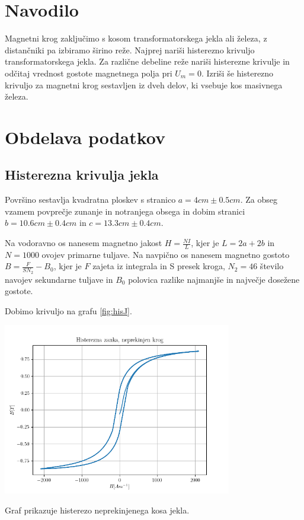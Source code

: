 \documentclass[12pt]{report}
\begin{document}
\chapter*{Navodilo}

Magnetni krog zaključimo s kosom transformatorskega jekla ali železa, z distančniki pa izbiramo širino reže. Najprej nariši histerezno krivuljo transformatorskega jekla. Za različne debeline reže nariši histerezne krivulje in odčitaj vrednost gostote magnetnega polja pri $U_m=0$. Izriši še histerezno krivuljo za magnetni krog sestavljen iz dveh delov, ki vsebuje kos masivnega železa. 
\endgroup


\chapter*{Obdelava podatkov}

\section*{Histerezna krivulja jekla}

Površino sestavlja kvadratna ploskev s stranico $a = 4cm \pm 0.5cm$. Za obseg vzamem povprečje zunanje in notranjega obsega in dobim stranici $b = 10.6cm \pm 0.4cm$ in $c = 13.3cm \pm 0.4cm$. 

Na vodoravno os nanesem magnetno jakost $H = \frac{NI}{L}$, kjer je $L = 2a + 2b$ in $N=1000$ ovojev primarne tuljave. Na navpično os nanesem magnetno gostoto $B= \frac{F}{SN_2} - B_0$, kjer je $F$ zajeta iz integrala in S presek kroga, $N_2 = 46$ število navojev sekundarne tuljave in $B_0$ polovica razlike najmanjše in največje dosežene gostote. 

Dobimo krivuljo na grafu \ref{fig:hisJ}. 

\begin{slika}[H]
  \centering
  \includegraphics[width=0.75\textwidth]{jeklo}
  \caption{\small Graf prikazuje histerezo neprekinjenega kosa jekla.}
  \label{fig:hisJ}
\end{slika}
\end{document}
